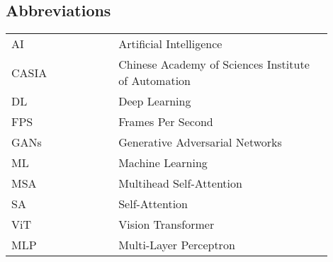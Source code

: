 \begin{center}
    \section*{Abbreviations}
    \begin{table}[h]
        \centering
        \renewcommand{\arraystretch}{1.5}
        \begin{tabular}{@{}p{0.3\linewidth}p{0.6\linewidth}@{}}
            AI    & Artificial Intelligence                             \\
            CASIA & Chinese Academy of Sciences Institute of Automation \\
            DL    & Deep Learning                                       \\
            FPS   & Frames Per Second                                   \\
            GANs  & Generative Adversarial Networks                     \\
            ML    & Machine Learning                                    \\
            MSA   & Multihead Self-Attention                            \\
            SA    & Self-Attention                                      \\
            ViT   & Vision Transformer                                  \\
            MLP   & Multi-Layer Perceptron                             \\
        \end{tabular}
    \end{table}
\end{center}
